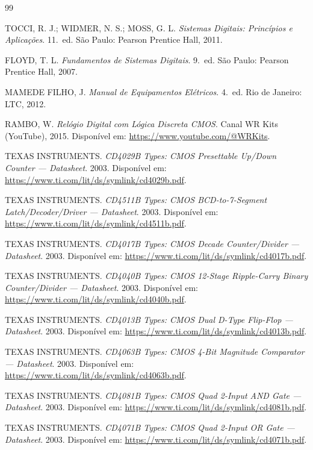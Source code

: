 \documentclass[12pt]{article}
\begin{document}
\begin{thebibliography}{99}

TOCCI, R. J.; WIDMER, N. S.; MOSS, G. L. \textit{Sistemas Digitais: Princípios e Aplicações}. 11.~ed. São Paulo: Pearson Prentice Hall, 2011.

FLOYD, T. L. \textit{Fundamentos de Sistemas Digitais}. 9.~ed. São Paulo: Pearson Prentice Hall, 2007.

MAMEDE FILHO, J. \textit{Manual de Equipamentos Elétricos}. 4.~ed. Rio de Janeiro: LTC, 2012.

RAMBO, W. \textit{Relógio Digital com Lógica Discreta CMOS}. Canal WR Kits (YouTube), 2015. Disponível em: \url{https://www.youtube.com/@WRKits}.

TEXAS INSTRUMENTS. \textit{CD4029B Types: CMOS Presettable Up/Down Counter — Datasheet}. 2003. Disponível em: \url{https://www.ti.com/lit/ds/symlink/cd4029b.pdf}.

TEXAS INSTRUMENTS. \textit{CD4511B Types: CMOS BCD-to-7-Segment Latch/Decoder/Driver — Datasheet}. 2003. Disponível em: \url{https://www.ti.com/lit/ds/symlink/cd4511b.pdf}.

TEXAS INSTRUMENTS. \textit{CD4017B Types: CMOS Decade Counter/Divider — Datasheet}. 2003. Disponível em: \url{https://www.ti.com/lit/ds/symlink/cd4017b.pdf}.

TEXAS INSTRUMENTS. \textit{CD4040B Types: CMOS 12-Stage Ripple-Carry Binary Counter/Divider — Datasheet}. 2003. Disponível em: \url{https://www.ti.com/lit/ds/symlink/cd4040b.pdf}.

TEXAS INSTRUMENTS. \textit{CD4013B Types: CMOS Dual D-Type Flip-Flop — Datasheet}. 2003. Disponível em: \url{https://www.ti.com/lit/ds/symlink/cd4013b.pdf}.

TEXAS INSTRUMENTS. \textit{CD4063B Types: CMOS 4-Bit Magnitude Comparator — Datasheet}. 2003. Disponível em: \url{https://www.ti.com/lit/ds/symlink/cd4063b.pdf}.

TEXAS INSTRUMENTS. \textit{CD4081B Types: CMOS Quad 2-Input AND Gate — Datasheet}. 2003. Disponível em: \url{https://www.ti.com/lit/ds/symlink/cd4081b.pdf}.

TEXAS INSTRUMENTS. \textit{CD4071B Types: CMOS Quad 2-Input OR Gate — Datasheet}. 2003. Disponível em: \url{https://www.ti.com/lit/ds/symlink/cd4071b.pdf}.

\end{thebibliography}
\end{document}
